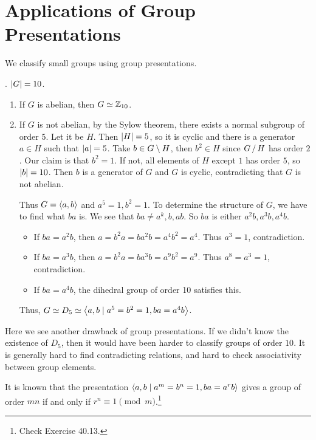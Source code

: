 \section*{Applications of Group Presentations}

We classify small groups using group presentations.

\ex. \(\left| G \right| = 10\).
\begin{enumerate}
    \item If \(G\) is abelian, then \(G \simeq \mathbb{Z}_{10}\).
    \item If \(G\) is not abelian, by the Sylow theorem, there exists a normal subgroup of order \(5\). Let it be \(H\). Then \(\left| H \right| = 5\), so it is cyclic and there is a generator \(a \in H\) such that \(\left| a \right| = 5\). Take \(b \in G \setminus H\), then \(b^2 \in H\) since \(G \operatorname{/} H\) has order \(2\). Our claim is that \(b^2 = 1\). If not, all elements of \(H\) except \(1\) has order \(5\), so \(\left| b \right| = 10\). Then \(b\) is a generator of \(G\) and \(G\) is cyclic, contradicting that \(G\) is not abelian.

          Thus \(G = \left\langle a, b \right\rangle\) and \(a^5 = 1, b^2 = 1\). To determine the structure of \(G\), we have to find what \(ba\) is. We see that \(ba \neq a^k, b, ab\). So \(ba\) is either \(a^2b, a^3b, a^4b\).

          \begin{itemize}
              \item If \(ba = a^2b\), then \(a = b^2a = ba^2b = a^4b^2 = a^4\). Thus \(a^3 = 1\), contradiction.
              \item If \(ba = a^3b\), then \(a = b^2a = ba^3b = a^9 b^2 = a^9\). Thus \(a^8 = a^3 = 1\), contradiction.
              \item If \(ba = a^4b\), the dihedral group of order 10 satisfies this.
          \end{itemize}
          Thus, \(G \simeq D_5 \simeq \left\langle a, b \mid a^5 = b^2 = 1, ba = a^4b \right\rangle\).
\end{enumerate}

Here we see another drawback of group presentations. If we didn't know the existence of \(D_5\), then it would have been harder to classify groups of order \(10\). It is generally hard to find contradicting relations, and hard to check associativity between group elements.

\rmk It is known that the presentation \(\left\langle a, b \mid a^m = b^n = 1, ba = a^rb \right\rangle\) gives a group of order \(mn\) if and only if \(r^n \equiv 1 \pmod m\).\footnote{Check Exercise 40.13.}

